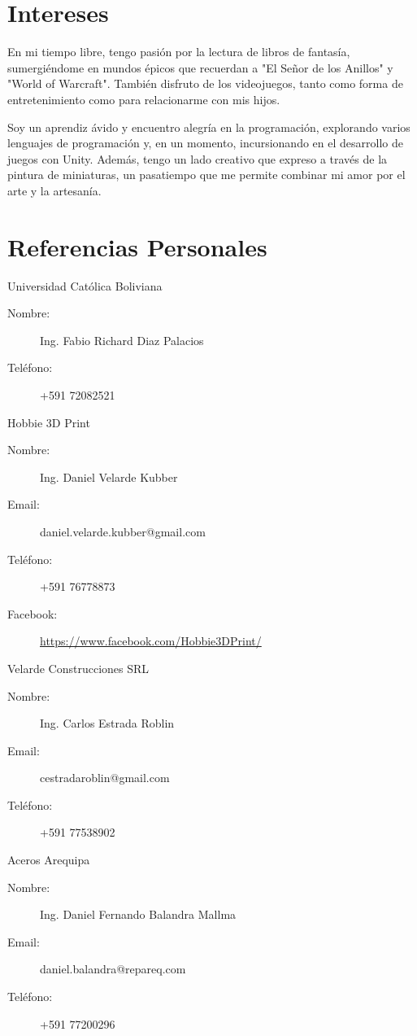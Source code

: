 \documentclass[a4paper,10pt]{article}
\begin{document}
\section*{Intereses}
En mi tiempo libre, tengo pasión por la lectura de libros de fantasía, sumergiéndome en mundos épicos que recuerdan a "El Señor de los Anillos" y "World of Warcraft". También disfruto de los videojuegos, tanto como forma de entretenimiento como para relacionarme con mis hijos.

Soy un aprendiz ávido y encuentro alegría en la programación, explorando varios lenguajes de programación y, en un momento, incursionando en el desarrollo de juegos con Unity. Además, tengo un lado creativo que expreso a través de la pintura de miniaturas, un pasatiempo que me permite combinar mi amor por el arte y la artesanía.


\section*{Referencias Personales}
\renewcommand{\refname}{}

\begin{thebibliography}{}
 Universidad Católica Boliviana
  \begin{description}
    \item[Nombre:] Ing. Fabio Richard Diaz Palacios
    \item[Teléfono:] +591 72082521
  \end{description}


 Hobbie 3D Print
  \begin{description}
    \item[Nombre:] Ing. Daniel Velarde Kubber
    \item[Email:] daniel.velarde.kubber@gmail.com
    \item[Teléfono:] +591 76778873
    \item[Facebook:] \url{https://www.facebook.com/Hobbie3DPrint/}
  \end{description}

 Velarde Construcciones SRL
  \begin{description}
    \item[Nombre:] Ing. Carlos Estrada Roblin
    \item[Email:] cestradaroblin@gmail.com
    \item[Teléfono:] +591 77538902
  \end{description}

 Aceros Arequipa
  \begin{description}
    \item[Nombre:] Ing. Daniel Fernando Balandra Mallma
    \item[Email:] daniel.balandra@repareq.com
    \item[Teléfono:] +591 77200296
  \end{description}

\end{thebibliography}
\end{document}
